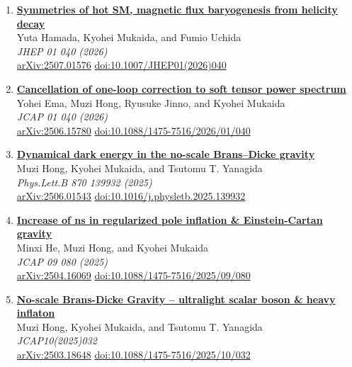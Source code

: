 \begin{enumerate}
\item \textbf{\href{https://arxiv.org/abs/2507.01576}{Symmetries of hot SM, magnetic flux baryogenesis from helicity decay}}\\
Yuta Hamada, Kyohei Mukaida, and Fumio Uchida\\
\emph{JHEP 01 040 (2026)}
\\ \href{https://arxiv.org/abs/2507.01576}{arXiv:2507.01576} \href{https://doi.org/10.1007/JHEP01(2026)040}{doi:10.1007/JHEP01(2026)040}

\item \textbf{\href{https://arxiv.org/abs/2506.15780}{Cancellation of one-loop correction to soft tensor power spectrum}}\\
Yohei Ema, Muzi Hong, Ryusuke Jinno, and Kyohei Mukaida\\
\emph{JCAP 01 040 (2026)}
\\ \href{https://arxiv.org/abs/2506.15780}{arXiv:2506.15780} \href{https://doi.org/10.1088/1475-7516/2026/01/040}{doi:10.1088/1475-7516/2026/01/040}

\item \textbf{\href{https://arxiv.org/abs/2506.01543}{Dynamical dark energy in the no-scale Brans–Dicke gravity}}\\
Muzi Hong, Kyohei Mukaida, and Tsutomu T. Yanagida\\
\emph{Phys.Lett.B 870 139932 (2025)}
\\ \href{https://arxiv.org/abs/2506.01543}{arXiv:2506.01543} \href{https://doi.org/10.1016/j.physletb.2025.139932}{doi:10.1016/j.physletb.2025.139932}

\item \textbf{\href{https://arxiv.org/abs/2504.16069}{Increase of ns in regularized pole inflation \& Einstein-Cartan gravity}}\\
Minxi He, Muzi Hong, and Kyohei Mukaida\\
\emph{JCAP 09 080 (2025)}
\\ \href{https://arxiv.org/abs/2504.16069}{arXiv:2504.16069} \href{https://doi.org/10.1088/1475-7516/2025/09/080}{doi:10.1088/1475-7516/2025/09/080}

\item \textbf{\href{https://arxiv.org/abs/2503.18648}{No-scale Brans-Dicke Gravity -- ultralight scalar boson \& heavy inflaton}}\\
Muzi Hong, Kyohei Mukaida, and Tsutomu T. Yanagida\\
\emph{JCAP10(2025)032}
\\ \href{https://arxiv.org/abs/2503.18648}{arXiv:2503.18648} \href{https://doi.org/10.1088/1475-7516/2025/10/032}{doi:10.1088/1475-7516/2025/10/032}


\end{enumerate}
